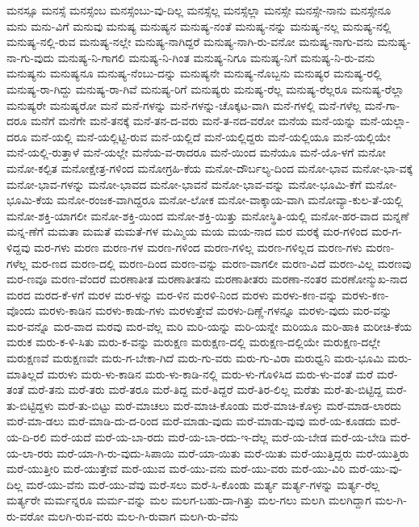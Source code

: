 {ಮನಸ್ಸೂ
ಮನಸ್ಸೆ
ಮನಸ್ಸೆಂಬ
ಮನಸ್ಸೆಂಬು-ವು-ದಿಲ್ಲ
ಮನಸ್ಸೆಲ್ಲ
ಮನಸ್ಸೆಲ್ಲಾ
ಮನಸ್ಸೇ
ಮನಸ್ಸೇ-ನಾನು
ಮನಸ್ಸೇನೂ
ಮನು
ಮನು-ವಿಗೆ
ಮನುವು
ಮನುಷ್ಯ
ಮನುಷ್ಯನ
ಮನುಷ್ಯ-ನಂತೆ
ಮನುಷ್ಯ-ನನ್ನು
ಮನುಷ್ಯ-ನಲ್ಲ
ಮನುಷ್ಯ-ನಲ್ಲಿ
ಮನುಷ್ಯ-ನಲ್ಲಿ-ರುವ
ಮನುಷ್ಯ-ನಲ್ಲೇ
ಮನುಷ್ಯ-ನಾಗಿದ್ದರೆ
ಮನುಷ್ಯ-ನಾಗಿ-ರು-ವನೋ
ಮನುಷ್ಯ-ನಾಗು-ವನು
ಮನುಷ್ಯ-ನಾ-ಗು-ವುದು
ಮನುಷ್ಯ-ನಿ-ಗಾಗಲಿ
ಮನುಷ್ಯ-ನಿ-ಗಿಂತ
ಮನುಷ್ಯ-ನಿಗೂ
ಮನುಷ್ಯ-ನಿಗೆ
ಮನುಷ್ಯ-ನಿ-ರು-ವನು
ಮನುಷ್ಯನು
ಮನುಷ್ಯನೂ
ಮನುಷ್ಯ-ನೆಂಬು-ದನ್ನು
ಮನುಷ್ಯನೇ
ಮನುಷ್ಯ-ನೊಬ್ಬನು
ಮನುಷ್ಯರ
ಮನುಷ್ಯ-ರಲ್ಲಿ
ಮನುಷ್ಯ-ರಾ-ಗಿದ್ದು
ಮನುಷ್ಯ-ರಾ-ಗಿವೆ
ಮನುಷ್ಯ-ರಿಗೆ
ಮನುಷ್ಯರು
ಮನುಷ್ಯ-ರೆಲ್ಲ
ಮನುಷ್ಯ-ರೆಲ್ಲರೂ
ಮನುಷ್ಯ-ರೆಲ್ಲಾ
ಮನುಷ್ಯರೇ
ಮನುಷ್ಯರೋ
ಮನೆ
ಮನೆ-ಗಳನ್ನು
ಮನೆ-ಗಳನ್ನು-ಚೊಕ್ಕಟ-ವಾಗಿ
ಮನೆ-ಗಳಲ್ಲಿ
ಮನೆ-ಗಳೆಲ್ಲ
ಮನೆ-ಗಾ-ದರೂ
ಮನೆಗೆ
ಮನೆಗೇ
ಮನೆ-ತನಕ್ಕೆ
ಮನೆ-ತನ-ದ-ವರು
ಮನೆ-ತ-ನದ-ವರೋ
ಮನೆಯ
ಮನೆ-ಯನ್ನು
ಮನೆ-ಯಲ್ಲಾ-ದರೂ
ಮನೆ-ಯಲ್ಲಿ
ಮನೆ-ಯಲ್ಲಿಟ್ಟಿ-ರುವ
ಮನೆ-ಯಲ್ಲಿದೆ
ಮನೆ-ಯಲ್ಲಿದ್ದರು
ಮನೆ-ಯಲ್ಲಿಯೂ
ಮನೆ-ಯಲ್ಲಿಯೇ
ಮನೆ-ಯಲ್ಲಿ-ರುತ್ತಾಳೆ
ಮನೆ-ಯಲ್ಲೇ
ಮನೆಯ-ವ-ರಾದರೂ
ಮನೆ-ಯಿಂದ
ಮನೆಯೂ
ಮನೆ-ಯೊ-ಳಗೆ
ಮನೋ
ಮನೋ-ಕಲ್ಪಿತ
ಮನೋಕ್ಷೇತ್ರ-ಗಳಿಂದ
ಮನೋಗ್ರಹಿ-ಕೆಯ
ಮನೋ-ದೌರ್ಬಲ್ಯ-ದಿಂದ
ಮನೋ-ಭಾವ
ಮನೋ-ಭಾ-ವಕ್ಕೆ
ಮನೋ-ಭಾವ-ಗಳನ್ನು
ಮನೋ-ಭಾವದ
ಮನೋ-ಭಾವನೆ
ಮನೋ-ಭಾವ-ವನ್ನು
ಮನೋ-ಭೂಮಿ-ಕೆಗೆ
ಮನೋ-ಭೂಮಿ-ಕೆಯ
ಮನೋ-ರಂಜಕ-ವಾಗಿದ್ದರೂ
ಮನೋ-ಲೋಕ
ಮನೋ-ವಾಕ್ಕಾಯ-ವಾಗಿ
ಮನೋವ್ಯಾ-ಕುಲ-ತೆ-ಯಲ್ಲಿ
ಮನೋ-ಶಕ್ತಿ-ಯಾಗಲೀ
ಮನೋ-ಶಕ್ತಿ-ಯಿಂದ
ಮನೋ-ಶಕ್ತಿ-ಯಿತ್ತು
ಮನೋಸ್ಥಿತಿ-ಯಲ್ಲಿ
ಮನೋ-ಹರ-ವಾದ
ಮನ್ನಣೆ
ಮನ್ನ-ಣೆಗೆ
ಮಮತಾ
ಮಮತೆ
ಮಮತೆ-ಗಳ
ಮಮ್ಮಿಯ
ಮಯ
ಮಯ-ನಾದ
ಮರ
ಮರಕ್ಕೆ
ಮರ-ಗಳಿಂದ
ಮರ-ಗ-ಳಿದ್ದವು
ಮರ-ಗಳು
ಮರಣ
ಮರಣ-ಗಳ
ಮರಣ-ಗಳಿಂದ
ಮರಣ-ಗಳಿಲ್ಲ
ಮರಣ-ಗಳಿಲ್ಲದ
ಮರಣ-ಗಳು
ಮರಣ-ಗಳೆಲ್ಲ
ಮರ-ಣದ
ಮರಣ-ದಲ್ಲಿ
ಮರಣ-ದಿಂದ
ಮರಣ-ವನ್ನು
ಮರಣ-ವಾಗಲೀ
ಮರಣ-ವಿದೆ
ಮರಣ-ವಿಲ್ಲ
ಮರಣವು
ಮರ-ಣವೂ
ಮರಣ-ವೆಂದರೆ
ಮರಣಾತೀತ
ಮರಣಾತೀತನು
ಮರಣಾತೀತರು
ಮರಣಾ-ನಂತರ
ಮರಣೋನ್ಮುಖ-ನಾದ
ಮರದ
ಮರದ-ಕೆ-ಳಗೆ
ಮರಳ
ಮರ-ಳನ್ನು
ಮರ-ಳಿನ
ಮರಳಿ-ನಿಂದ
ಮರಳು
ಮರಳು-ಕಣ-ವನ್ನು
ಮರಳು-ಕಣ-ವೊಂದು
ಮರಳು-ಕಾಡಿನ
ಮರಳು-ಕಾಡು-ಗಳು
ಮರಳುತ್ತೇವೆ
ಮರಳು-ದಿಣ್ಣೆ-ಗಳನ್ನೂ
ಮರಳು-ವುದು
ಮರ-ವನ್ನು
ಮರ-ವನ್ನೊ
ಮರ-ವಾದ
ಮರವು
ಮರ-ವೆಲ್ಲ
ಮರಿ
ಮರಿ-ಯನ್ನು
ಮರಿ-ಯನ್ನೇ
ಮರಿಯೂ
ಮರಿ-ಹಾಕಿ
ಮರೀಚಿ-ಕೆಯ
ಮರುಕ
ಮರು-ಕ-ಳಿ-ಸಿತು
ಮರು-ಕ-ವನ್ನು
ಮರುಕ್ಷಣ
ಮರುಕ್ಷಣ-ದಲ್ಲಿ
ಮರುಕ್ಷಣ-ದಲ್ಲಿಯೇ
ಮರುಕ್ಷಣ-ದಲ್ಲೇ
ಮರುಕ್ಷಣವೆ
ಮರುಕ್ಷಣವೇ
ಮರು-ಗ-ಬೇಕಾ-ಗಿದೆ
ಮರು-ಗು-ವರು
ಮರು-ಗು-ವಿರಾ
ಮರುಧ್ವನಿ
ಮರು-ಭೂಮಿ
ಮರು-ಮಾತಿಲ್ಲದೆ
ಮರುಳು
ಮರು-ಳು-ಕಾಡಿನ
ಮರು-ಳು-ಕಾಡಿ-ನಲ್ಲಿ
ಮರು-ಳು-ಗೊಳಿಸಿದ
ಮರು-ಳು-ವಂತೆ
ಮರೆ
ಮರೆ-ತಂತೆ
ಮರೆ-ತನು
ಮರೆ-ತರು
ಮರೆ-ತರೂ
ಮರೆ-ತಿದ್ದ
ಮರೆ-ತಿದ್ದರೆ
ಮರೆ-ತಿರ-ಲಿಲ್ಲ
ಮರೆತು
ಮರೆ-ತು-ಬಿಟ್ಟಿದ್ದ
ಮರೆ-ತು-ಬಿಟ್ಟಿದ್ದಳು
ಮರೆ-ತು-ಬಿಟ್ಟು
ಮರೆ-ಮಾಚಲು
ಮರೆ-ಮಾಚಿ-ಕೊಂಡು
ಮರೆ-ಮಾಚಿ-ಕೊಳ್ಳು
ಮರೆ-ಮಾಡ-ಲಾರದು
ಮರೆ-ಮಾ-ಡಲು
ಮರೆ-ಮಾಡಿ-ದು-ದ-ರಿಂದ
ಮರೆ-ಮಾಡು-ವುದು
ಮರೆ-ಮಾಡು-ವುವು
ಮರೆ-ಯ-ಕೂಡದು
ಮರೆ-ಯ-ದಿ-ರಲಿ
ಮರೆ-ಯದೆ
ಮರೆ-ಯ-ಬಾ-ರದು
ಮರೆ-ಯ-ಬಾ-ರದು-ಇ-ದೆಲ್ಲ
ಮರೆ-ಯ-ಬೇಡ
ಮರೆ-ಯ-ಬೇಡಿ
ಮರೆ-ಯ-ಲಾ-ರರು
ಮರೆ-ಯಾ-ಗಿ-ರು-ವುದು-ಸಿಪಾಯಿ
ಮರೆ-ಯಾ-ಯಿತು
ಮರೆ-ಯಿತು
ಮರೆ-ಯುತ್ತಿದ್ದರು
ಮರೆ-ಯುತ್ತಿರು
ಮರೆ-ಯುತ್ತೀರಿ
ಮರೆ-ಯುತ್ತೇವೆ
ಮರೆ-ಯುವ
ಮರೆ-ಯು-ವನು
ಮರೆ-ಯು-ವರು
ಮರೆ-ಯು-ವಿರಿ
ಮರೆ-ಯು-ವು-ದಿಲ್ಲ
ಮರೆ-ಯು-ವೆನು
ಮರೆ-ಯು-ವೆವು
ಮರೆ-ಸಲು
ಮರೆ-ಸಿ-ಕೊಂಡು
ಮರ್ತ್ಯ
ಮರ್ತ್ಯ-ಗಳನ್ನು
ಮರ್ತ್ಯ-ರೆಲ್ಲ
ಮರ್ತ್ಯರೇ
ಮರ್ಮನ್ನರೂ
ಮರ್ಮ-ವನ್ನು
ಮಲ
ಮಲಗ-ಬಹು-ದಾ-ಗಿತ್ತು
ಮಲ-ಗಲು
ಮಲಗಿ
ಮಲಗಿದ್ದಾಗ
ಮಲ-ಗಿ-ರು-ವರೋ
ಮಲಗಿ-ರುವ-ವರು
ಮಲ-ಗಿ-ರುವಾಗ
ಮಲಗಿ-ರು-ವೆನು
}
